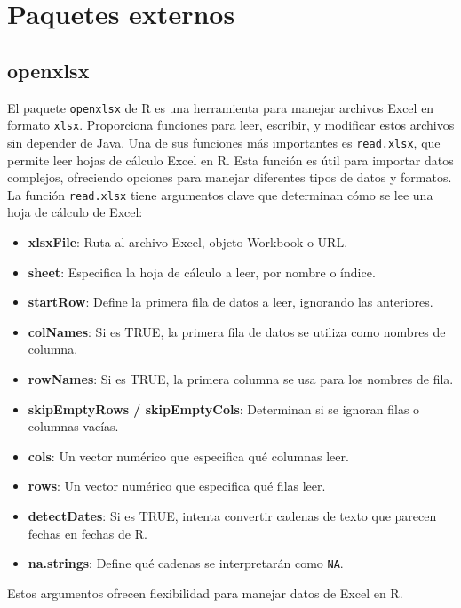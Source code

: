\documentclass[12pt]{report}\usepackage[]{graphicx}\usepackage[dvipsnames]{xcolor}
\begin{document}
 	
 	\chapter{Paquetes externos}
 	
 	\section{openxlsx}
 	
 	El paquete \texttt{openxlsx} de R es una herramienta para manejar archivos Excel en formato \texttt{xlsx}. Proporciona funciones para leer, escribir, y modificar estos archivos sin depender de Java. Una de sus funciones más importantes es \texttt{read.xlsx}, que permite leer hojas de cálculo Excel en R. Esta función es útil para importar datos complejos, ofreciendo opciones para manejar diferentes tipos de datos y formatos.\\
 	
 	La función \texttt{read.xlsx} tiene argumentos clave que determinan cómo se lee una hoja de cálculo de Excel:
 	
 	\begin{itemize}
 		\item \textbf{xlsxFile}: Ruta al archivo Excel, objeto Workbook o URL.
 		\item \textbf{sheet}: Especifica la hoja de cálculo a leer, por nombre o índice.
 		\item \textbf{startRow}: Define la primera fila de datos a leer, ignorando las anteriores.
 		\item \textbf{colNames}: Si es TRUE, la primera fila de datos se utiliza como nombres de columna.
 		\item \textbf{rowNames}: Si es TRUE, la primera columna se usa para los nombres de fila.
 		\item \textbf{skipEmptyRows / skipEmptyCols}: Determinan si se ignoran filas o columnas vacías.
 		\item \textbf{cols}: Un vector numérico que especifica qué columnas leer.
 		\item \textbf{rows}: Un vector numérico que especifica qué filas leer.
 		\item \textbf{detectDates}: Si es TRUE, intenta convertir cadenas de texto que parecen fechas en fechas de R.
 		\item \textbf{na.strings}: Define qué cadenas se interpretarán como \texttt{NA}.
 	\end{itemize}
 	
 	Estos argumentos ofrecen flexibilidad para manejar datos de Excel en R.
 	
\end{document}
